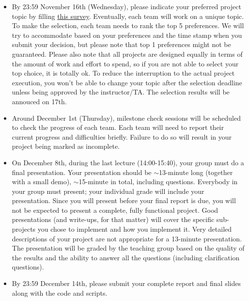 \documentclass[a4paper,12pt,twoside]{article}
\begin{document}
\begin{itemize}
    \item By 23:59 November 16th (Wednesday), please indicate your preferred project topic by filling \href{https://wenjuan.feishu.cn/m?t=sKyT2NHNiuHi-nwym}{this survey}. Eventually, each team will work on a unique topic. To make the selection, each team needs to rank the top 5 preferences. We will try to accommodate based on your preferences and the time stamp when you submit your decision, but please note that top 1 preferences might not be guaranteed. Please also note that all projects are designed equally in terms of the amount of work and effort to spend, so if you are not able to select your top choice, it is totally ok. To reduce the interruption to the actual project execution, you won’t be able to change your topic after the selection deadline unless being approved by the instructor/TA. The selection results will be annouced on 17th.
    \item Around December 1st (Thursday), milestone check sessions will be scheduled to check the progress of each team. Each team will need to report their current progress and difficulties briefly. Failure to do so will result in your project being marked as incomplete.
    \item On December 8th, during the last lecture (14:00-15:40), your group must do a final presentation. Your presentation should be $\sim$13-minute long (together with a small demo), $\sim$15-minute in total, including questions. Everybody in your group must present; your individual grade will include your presentation. Since you will present before your final report is due, you will not be expected to present a complete, fully functional project. Good presentations (and write-ups, for that matter) will cover the specific sub-projects you chose to implement and how you implement it. Very detailed descriptions of your project are not appropriate for a 13-minute presentation. The presentation will be graded by the teaching group based on the quality of the results and the ability to answer all the questions (including clarification questions).
    \item By 23:59 December 14th, please submit your complete report and final slides along with the code and scripts.
\end{itemize}
\end{document}
